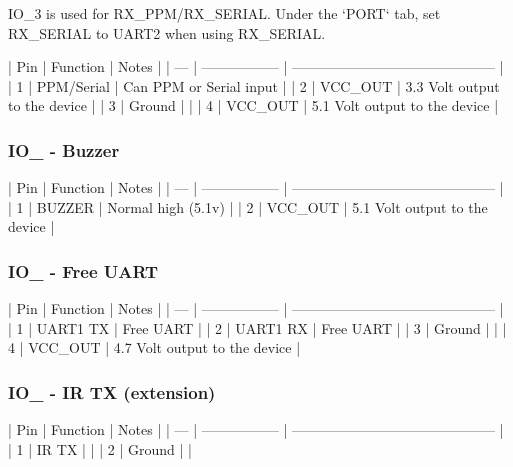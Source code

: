 \begin{DoxyVerb}IO_3 is used for RX_PPM/RX_SERIAL. Under the `PORT` tab, set RX_SERIAL to UART2 when using RX_SERIAL.

| Pin | Function          | Notes                                        |
| --- | ----------------- | -------------------------------------------- |
| 1   | PPM/Serial        | Can PPM or Serial input                      |
| 2   | VCC_OUT           | 3.3 Volt output to the device                |
| 3   | Ground            |                                              |
| 4   | VCC_OUT           | 5.1 Volt output to the device                |
\end{DoxyVerb}


\subsubsection*{I\+O\+\_ -\/ Buzzer}

\begin{DoxyVerb}| Pin | Function          | Notes                                        |
| --- | ----------------- | -------------------------------------------- |
| 1   | BUZZER            | Normal high (5.1v)                           |
| 2   | VCC_OUT           | 5.1 Volt output to the device                |
\end{DoxyVerb}


\subsubsection*{I\+O\+\_ -\/ Free U\+A\+R\+T}

\begin{DoxyVerb}| Pin | Function          | Notes                                        |
| --- | ----------------- | -------------------------------------------- |
| 1   | UART1 TX          | Free UART                                    |
| 2   | UART1 RX          | Free UART                                    |
| 3   | Ground            |                                              |
| 4   | VCC_OUT           | 4.7 Volt output to the device                |
\end{DoxyVerb}


\subsubsection*{I\+O\+\_ -\/ I\+R T\+X (extension)}

\begin{DoxyVerb}| Pin | Function          | Notes                                        |
| --- | ----------------- | -------------------------------------------- |
| 1   | IR TX             |                                              |
| 2   | Ground            |                                              |\end{DoxyVerb}
 